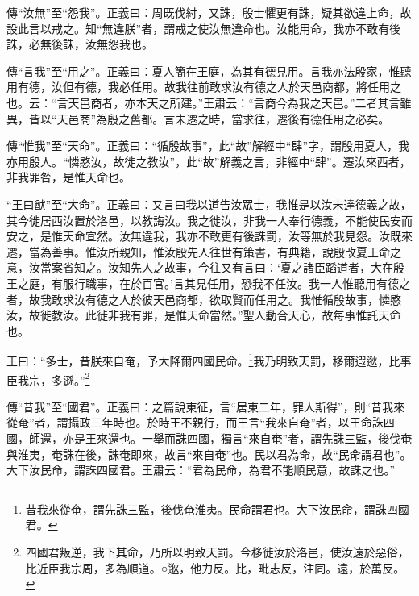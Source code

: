 {\noindent\zhuan{}\fzbyks 傳“汝無”至“怨我”。正義曰：周既伐紂，又誅，殷士懼更有誅，疑其欲違上命，故設此言以戒之。知“無違朕”者，謂戒之使汝無違命也。汝能用命，我亦不敢有後誅，必無後誅，汝無怨我也。 \par}

{\noindent\zhuan{}\fzbyks 傳“言我”至“用之”。正義曰：夏人簡在王庭，為其有德見用。言我亦法殷家，惟聽用有德，汝但有德，我必任用。故我往前敢求汝有德之人於天邑商都，將任用之也。云：“言天邑商者，亦本天之所建。”王肅云：“言商今為我之天邑。”二者其言雖異，皆以“天邑商”為殷之舊都。言未遷之時，當求往，遷後有德任用之必矣。 \par}

{\noindent\zhuan{}\fzbyks 傳“惟我”至“天命”。正義曰：“循殷故事”，此“故”解經中“肆”字，謂殷用夏人，我亦用殷人。“憐愍汝，故徙之教汝”，此“故”解義之言，非經中“肆”。遷汝來西者，非我罪咎，是惟天命也。 \par}

{\noindent\shu{}\fzkt “王曰猷”至“大命”。正義曰：又言曰我以道告汝眾士，我惟是以汝未達德義之故，其今徙居西汝置於洛邑，以教誨汝。我之徙汝，非我一人奉行德義，不能使民安而安之，是惟天命宜然。汝無違我，我亦不敢更有後誅罰，汝等無於我見怨。汝既來遷，當為善事。惟汝所親知，惟汝殷先人往世有策書，有典籍，說殷改夏王命之意，汝當案省知之。汝知先人之故事，今往又有言曰：‘夏之諸臣蹈道者，大在殷王之庭，有服行職事，在於百官。’言其見任用，恐我不任汝。我一人惟聽用有德之者，故我敢求汝有德之人於彼天邑商都，欲取賢而任用之。我惟循殷故事，憐愍汝，故徙教汝。此徙非我有罪，是惟天命當然。”聖人動合天心，故每事惟託天命也。 \par}

王曰：“多士，昔朕來自奄，予大降爾四國民命。\footnote{昔我來從奄，謂先誅三監，後伐奄淮夷。民命謂君也。大下汝民命，謂誅四國君。}我乃明致天罰，移爾遐逖，比事臣我宗，多遜。”\footnote{四國君叛逆，我下其命，乃所以明致天罰。今移徙汝於洛邑，使汝遠於惡俗，比近臣我宗周，多為順道。○逖，他力反。比，毗志反，注同。遠，於萬反。}


{\noindent\zhuan{}\fzbyks 傳“昔我”至“國君”。正義曰：之篇說東征，言“居東二年，罪人斯得”，則“昔我來從奄”者，謂攝政三年時也。於時王不親行，而王言“我來自奄”者，以王命誅四國，師還，亦是王來還也。一舉而誅四國，獨言“來自奄”者，謂先誅三監，後伐奄與淮夷，奄誅在後，誅奄即來，故言“來自奄”也。民以君為命，故“民命謂君也”。大下汝民命，謂誅四國君。王肅云：“君為民命，為君不能順民意，故誅之也。” \par}

